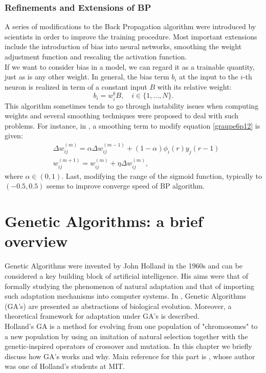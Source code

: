 \documentclass[%
    corpo=11pt,
    twoside,
    stile=classica,
    oldstyle,
    autoretitolo,
    tipotesi=magistrale,
    greek,
    evenboxes,
    english
]{toptesi}
\begin{document}
\subsection{Refinements and Extensions of BP}
A series of modifications to the Back Propagation algorithm were introduced by scientists in order to improve the training procedure. Most important extensions include the introduction of bias into neural networks, smoothing the weight adjustment function and rescaling the activation function. \\
If we want to consider bias in a model, we can regard it as a trainable quantity, just as is any other weight. In general, the bias term $b_i$ at the input to the $i$-th neuron is realized in term of a constant input $B$ with its relative weight:
\begin{equation}
b_i = w^b_i B, \quad i \in \{1,\dots,N\}.
\end{equation}
This algorithm sometimes tends to go through instability issues when computing weights and several smoothing techniques were proposed to deal with such problems. For instance, in \cite{sejnowski}, a smoothing term to modify equation \eqref{graupe6p12} is given:
\begin{align}
&\Delta w_{ij}^{(m)} = \alpha \Delta w_{ij}^{(m-1)} + (1-\alpha)\phi_i(r)y_j(r-1)  \nonumber \\
& w_{ij}^{(m+1)} = w_{ij}^{(m)} + \eta \Delta w_{ij}^{(m)},
\end{align}
where $\alpha \in \left(0,1 \right)$.
Last, modifying the range of the sigmoid function, typically to $\left(-0.5,0.5\right)$ seems to improve converge speed of BP algorithm. 


\chapter{Genetic Algorithms: a brief overview}
Genetic Algorithms were invented by John Holland in the 1960s and can be considered a key building block of artificial intelligence. His aims were that of  formally studying the phenomenon of natural adaptation and that of importing such adaptation mechanisms into computer systems. In \cite{holland}, Genetic Algorithms (GA's) are presented as abstractions of biological evolution. Moreover, a theoretical framework for adaptation under GA's is described. \\
Holland's GA is a method for evolving from one population of "chromosomes" to a new population by using an imitation of natural selection together with the genetic-inspired operators of crossover and mutation. In this chapter we briefly discuss how GA's works and why. Main reference for this part is \cite{mit}, whose author was one of Holland's students at MIT.
\end{document}
